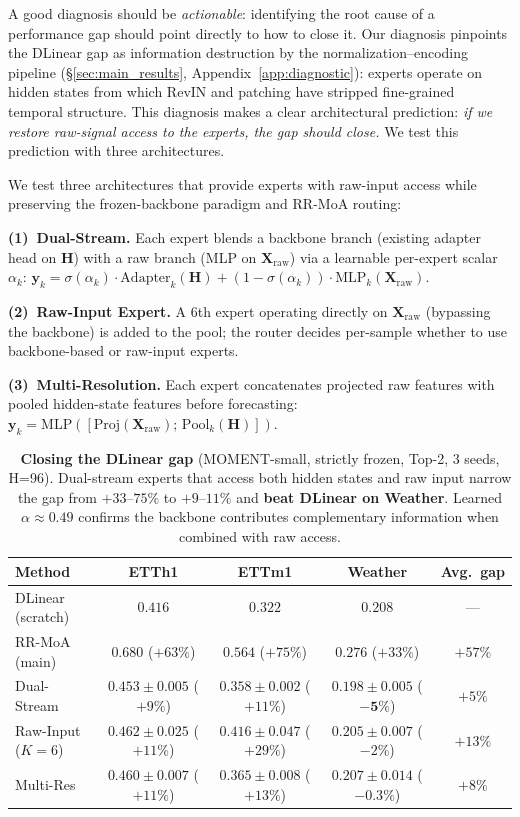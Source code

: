 \documentclass{article}
\begin{document}
A good diagnosis should be \emph{actionable}: identifying the root cause of a performance gap should point directly to how to close it. Our diagnosis pinpoints the DLinear gap as information destruction by the normalization--encoding pipeline (\S\ref{sec:main_results}, Appendix~\ref{app:diagnostic}): experts operate on hidden states from which RevIN and patching have stripped fine-grained temporal structure. This diagnosis makes a clear architectural prediction: \emph{if we restore raw-signal access to the experts, the gap should close.} We test this prediction with three architectures.

We test three architectures that provide experts with raw-input access while preserving the frozen-backbone paradigm and RR-MoA routing:

\textbf{(1)~Dual-Stream.} Each expert blends a backbone branch (existing adapter head on $\mathbf{H}$) with a raw branch (MLP on $\mathbf{X}_\text{raw}$) via a learnable per-expert scalar $\alpha_k$: $\mathbf{y}_k = \sigma(\alpha_k)\cdot\text{Adapter}_k(\mathbf{H}) + (1{-}\sigma(\alpha_k))\cdot\text{MLP}_k(\mathbf{X}_\text{raw})$.

\textbf{(2)~Raw-Input Expert.} A 6th expert operating directly on $\mathbf{X}_\text{raw}$ (bypassing the backbone) is added to the pool; the router decides per-sample whether to use backbone-based or raw-input experts.

\textbf{(3)~Multi-Resolution.} Each expert concatenates projected raw features with pooled hidden-state features before forecasting: $\mathbf{y}_k = \text{MLP}([\text{Proj}(\mathbf{X}_\text{raw});\, \text{Pool}_k(\mathbf{H})])$.

\begin{table}[!htbp]
\centering
\caption{\textbf{Closing the DLinear gap} (MOMENT-small, strictly frozen, Top-2, 3 seeds, H=96). Dual-stream experts that access both hidden states and raw input narrow the gap from $+33$--$75\%$ to $+9$--$11\%$ and \textbf{beat DLinear on Weather}. Learned $\alpha{\approx}0.49$ confirms the backbone contributes complementary information when combined with raw access.}
\label{tab:gap_closing}
\footnotesize
\begin{tabular}{@{}lcccc@{}}
\toprule
Method & ETTh1 & ETTm1 & Weather & Avg.\ gap \\
\midrule
DLinear (scratch) & $\mathit{0.416}$ & $\mathit{0.322}$ & $\mathit{0.208}$ & --- \\
RR-MoA (main) & $0.680$ ($+63\%$) & $0.564$ ($+75\%$) & $0.276$ ($+33\%$) & $+57\%$ \\
\midrule
Dual-Stream & $\mathbf{0.453{\pm}0.005}$ ($+9\%$) & $\mathbf{0.358{\pm}0.002}$ ($+11\%$) & $\mathbf{0.198{\pm}0.005}$ ($\mathbf{-5\%}$) & $+5\%$ \\
Raw-Input ($K{=}6$) & $0.462{\pm}0.025$ ($+11\%$) & $0.416{\pm}0.047$ ($+29\%$) & $0.205{\pm}0.007$ ($-2\%$) & $+13\%$ \\
Multi-Res & $0.460{\pm}0.007$ ($+11\%$) & $0.365{\pm}0.008$ ($+13\%$) & $0.207{\pm}0.014$ ($-0.3\%$) & $+8\%$ \\
\bottomrule
\end{tabular}
\end{table}
\end{document}
